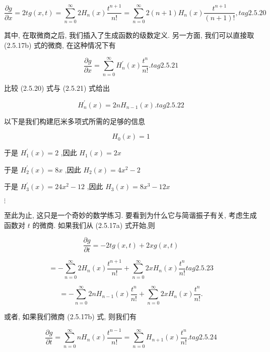 \documentclass[lang=cn,newtx,10pt,scheme=chinese,thmcnt=section]{elegantbook}
\begin{document}
$$
\frac{\partial g}{\partial x} = {2tg}\left( {x, t}\right) = \mathop{\sum }\limits_{{n = 0}}^{\infty }2{H}_{n}\left( x\right) \frac{{t}^{n + 1}}{n!} = \mathop{\sum }\limits_{{n = 0}}^{\infty }2\left( {n + 1}\right) {H}_{n}\left( x\right) \frac{{t}^{n + 1}}{\left( {n + 1}\right) !}, tag{2.5.20}
$$

其中, 在取微商之后, 我们插入了生成函数的级数定义. 另一方面, 我们可以直接取 (2.5.17b) 式的微商, 在这种情况下有

$$
\frac{\partial g}{\partial x} = \mathop{\sum }\limits_{{n = 0}}^{\infty }{H}_{n}^{\prime }\left( x\right) \frac{{t}^{n}}{n!}. tag{2.5.21}
$$

比较 (2.5.20) 式与 (2.5.21) 式给出

$$
{H}_{n}^{\prime }\left( x\right) = {2n}{H}_{n - 1}\left( x\right) . tag{2.5.22}
$$

以下是我们构建厄米多项式所需的足够的信息

$$
{H}_{0}\left( x\right) = 1
$$

于是 ${H}_{1}^{\prime }\left( x\right) = 2$ ,因此 ${H}_{1}\left( x\right) = {2x}$

于是 ${H}_{2}^{\prime }\left( x\right) = {8x}$ ,因此 ${H}_{2}\left( x\right) = 4{x}^{2} - 2$

于是 ${H}_{3}^{\prime }\left( x\right) = {24}{x}^{2} - {12}$ ,因此 ${H}_{3}\left( x\right) = 8{x}^{3} - {12x}$

$\vdots$

至此为止, 这只是一个奇妙的数学练习. 要看到为什么它与简谐振子有关, 考虑生成函数对 $t$ 的微商. 如果我们从 (2.5.17a) 式开始,则

$$
\frac{\partial g}{\partial t} = - {2tg}\left( {x, t}\right) + {2xg}\left( {x, t}\right)
$$

$$
= - \mathop{\sum }\limits_{{n = 0}}^{\infty }2{H}_{n}\left( x\right) \frac{{t}^{n + 1}}{n!} + \mathop{\sum }\limits_{{n = 0}}^{\infty }{2x}{H}_{n}\left( x\right) \frac{{t}^{n}}{n!} tag{2.5.23}
$$

$$
= - \mathop{\sum }\limits_{{n = 0}}^{\infty }{2n}{H}_{n - 1}\left( x\right) \frac{{t}^{n}}{n!} + \mathop{\sum }\limits_{{n = 0}}^{\infty }{2x}{H}_{n}\left( x\right) \frac{{t}^{n}}{n!}.
$$

或者, 如果我们微商 (2.5.17b) 式, 则我们有

$$
\frac{\partial g}{\partial t} = \mathop{\sum }\limits_{{n = 0}}^{\infty }n{H}_{n}\left( x\right) \frac{{t}^{n - 1}}{n!} = \mathop{\sum }\limits_{{n = 0}}^{\infty }{H}_{n + 1}\left( x\right) \frac{{t}^{n}}{n!}. tag{2.5.24}
$$
\end{document}
